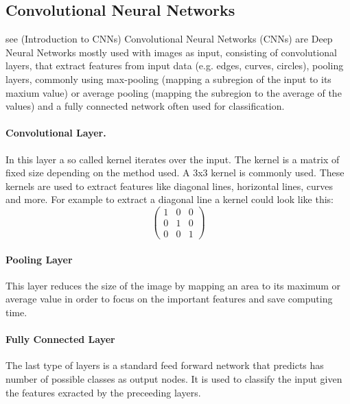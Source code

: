\subsection{Convolutional Neural Networks}
see \cite{wu2017introduction} (Introduction to CNNs)
Convolutional Neural Networks (CNNs) are Deep Neural Networks mostly used with images as input, consisting of convolutional layers, that extract features from input data (e.g. edges, curves, circles), pooling layers, commonly using max-pooling (mapping a subregion of the input to its maxium value) or average pooling (mapping the subregion to the average of the values) and a fully connected network often used for classification. 

\paragraph{Convolutional Layer.}
In this layer a so called kernel iterates over the input. The kernel is a matrix of fixed size depending on the method used. A 3x3 kernel is commonly used. These kernels are used to extract features like diagonal lines, horizontal lines, curves and more. For example to extract a diagonal line a kernel could look like this:
$$
\begin{pmatrix}
	1 & 0 & 0\\
	0 & 1 & 0\\
	0 & 0 & 1
\end{pmatrix}
$$

\paragraph{Pooling Layer}
This layer reduces the size of the image by mapping an area to its maximum or average value in order to focus on the important features and save computing time.


\paragraph{Fully Connected Layer}
The last type of layers is a standard feed forward network that predicts has number of possible classes as output nodes. It is used to classify the input given the features exracted by the preceeding layers. 




